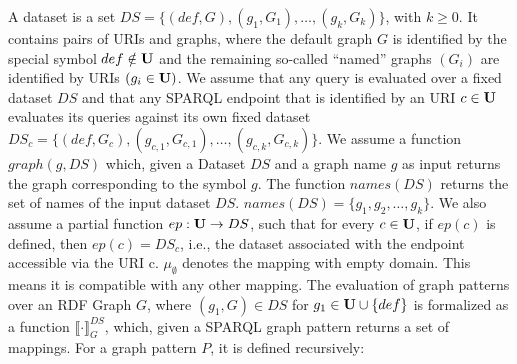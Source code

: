 \begin{definition}
	A dataset is a set $DS = \{(def, G), (g_1,G_1), \dots, (g_k, G_k) \}$, with
	$k\geq 0$. It contains pairs of URIs and graphs,
	where the default graph $G$ is identified by the special symbol $def \notin \mathbf{U}$
	and the remaining so-called ``named'' graphs $(G_i)$ are identified by URIs
	$(g_i \in \mathbf{U})$. We assume that any query is evaluated over a fixed dataset $DS$
	and that any SPARQL endpoint that is identified by an URI $c \in \mathbf{U}$ evaluates
	its queries against its own fixed dataset 
	$DS_c = \{ (def, G_c),(g_{c,1},G_{c,1}), \dots, (g_{c,k},G_{c,k})\}$.
	We assume a function $graph(g,DS)$ which, given a Dataset $DS$ and a graph name $g$ as
	input returns the graph corresponding to the symbol $g$. The function
	$names(DS)$ returns the set of names of the input dataset $DS$.
	$names(DS) = \{g_1,g_2,\dots,g_k\}$.
	We also assume a partial function $ep: \mathbf{U} \rightarrow DS$, such that for every $c \in
	\mathbf{U}$, if $ep(c)$ is defined, then $ep(c) = DS_c$, i.e., the dataset associated with
	the endpoint accessible via the URI c.
	$\mu_\emptyset$ denotes the mapping with empty domain. This means it is
	compatible with any other mapping.
	The evaluation of graph patterns over an RDF Graph $G$, where $(g_1,G) \in
	DS$ for $g_1 \in \mathbf{U}\cup\{def\}$ is formalized as a
	function  $\llbracket \cdot \rrbracket_G^{DS}$, which, given a SPARQL graph pattern
	returns a set of mappings.
	For a graph pattern $P$, it is defined recursively:\\
\end{definition}
